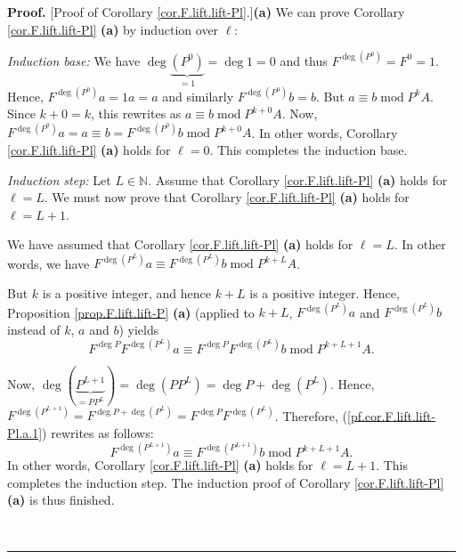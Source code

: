\documentclass[numbers=enddot,12pt,final,onecolumn,notitlepage]{scrartcl}%
\theoremstyle{definition}
\newenvironment{proof}[1][Proof]{\noindent\textbf{#1.} }{\ \rule{0.5em}{0.5em}}
\begin{document}
\begin{proof}
[Proof of Corollary \ref{cor.F.lift.lift-Pl}.]\textbf{(a)} We can prove
Corollary \ref{cor.F.lift.lift-Pl} \textbf{(a)} by induction over $\ell$:

\textit{Induction base:} We have $\deg\underbrace{\left(  P^{0}\right)  }%
_{=1}=\deg1=0$ and thus $F^{\deg\left(  P^{0}\right)  }=F^{0}=1$. Hence,
$F^{\deg\left(  P^{0}\right)  }a=1a=a$ and similarly $F^{\deg\left(
P^{0}\right)  }b=b$. But $a\equiv b\operatorname{mod}P^{k}A$. Since $k+0=k$,
this rewrites as $a\equiv b\operatorname{mod}P^{k+0}A$. Now, $F^{\deg\left(
P^{0}\right)  }a=a\equiv b=F^{\deg\left(  P^{0}\right)  }b\operatorname{mod}%
P^{k+0}A$. In other words, Corollary \ref{cor.F.lift.lift-Pl} \textbf{(a)}
holds for $\ell=0$. This completes the induction base.

\textit{Induction step:} Let $L\in\mathbb{N}$. Assume that Corollary
\ref{cor.F.lift.lift-Pl} \textbf{(a)} holds for $\ell=L$. We must now prove
that Corollary \ref{cor.F.lift.lift-Pl} \textbf{(a)} holds for $\ell=L+1$.

We have assumed that Corollary \ref{cor.F.lift.lift-Pl} \textbf{(a)} holds for
$\ell=L$. In other words, we have $F^{\deg\left(  P^{L}\right)  }a\equiv
F^{\deg\left(  P^{L}\right)  }b\operatorname{mod}P^{k+L}A$.

But $k$ is a positive integer, and hence $k+L$ is a positive integer. Hence,
Proposition \ref{prop.F.lift.lift-P} \textbf{(a)} (applied to $k+L$,
$F^{\deg\left(  P^{L}\right)  }a$ and $F^{\deg\left(  P^{L}\right)  }b$
instead of $k$, $a$ and $b$) yields
\begin{equation}
F^{\deg P}F^{\deg\left(  P^{L}\right)  }a\equiv F^{\deg P}F^{\deg\left(
P^{L}\right)  }b\operatorname{mod}P^{k+L+1}A.
\label{pf.cor.F.lift.lift-Pl.a.1}%
\end{equation}


Now, $\deg\left(  \underbrace{P^{L+1}}_{=PP^{L}}\right)  =\deg\left(
PP^{L}\right)  =\deg P+\deg\left(  P^{L}\right)  $. Hence, $F^{\deg\left(
P^{L+1}\right)  }=F^{\deg P+\deg\left(  P^{L}\right)  }=F^{\deg P}%
F^{\deg\left(  P^{L}\right)  }$. Therefore, (\ref{pf.cor.F.lift.lift-Pl.a.1})
rewrites as follows:%
\[
F^{\deg\left(  P^{L+1}\right)  }a\equiv F^{\deg\left(  P^{L+1}\right)
}b\operatorname{mod}P^{k+L+1}A.
\]
In other words, Corollary \ref{cor.F.lift.lift-Pl} \textbf{(a)} holds for
$\ell=L+1$. This completes the induction step. The induction proof of
Corollary \ref{cor.F.lift.lift-Pl} \textbf{(a)} is thus finished. \medskip


\end{proof}
\end{document}
